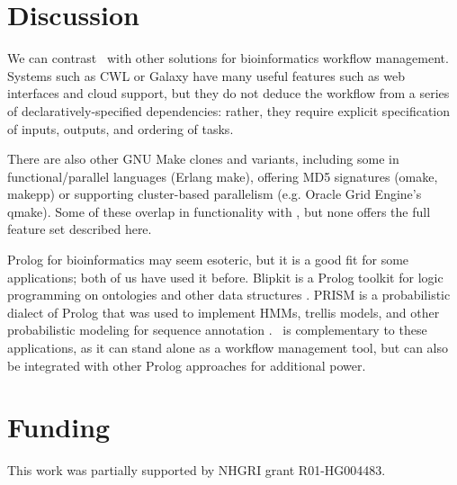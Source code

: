 \section*{Discussion}

We can contrast \biomake\ with other solutions for bioinformatics workflow management.
Systems such as CWL or Galaxy have many useful features such as web interfaces and cloud support,
but they do not deduce the workflow from a series of declaratively-specified dependencies: rather, they require explicit specification of inputs, outputs, and ordering of tasks.

There are also other GNU Make clones and variants, including some in functional/parallel languages (Erlang make),
offering MD5 signatures (omake, makepp)
or supporting cluster-based parallelism (e.g. Oracle Grid Engine's qmake).
Some of these overlap in functionality with \biomake, but none offers the full feature set described here.

Prolog for bioinformatics may seem esoteric, but it is a good fit for some applications; both of us have used it before.
Blipkit is a Prolog toolkit for logic programming on ontologies and other data structures \citep{Blipkit2009}.
PRISM is a probabilistic dialect of Prolog that was used to implement HMMs, trellis models, and other probabilistic modeling for sequence annotation \citep{MorkHolmes2012,HaveMork2014}.
\biomake\ is complementary to these applications, as it can stand alone as a workflow management tool, but can also be integrated with other Prolog approaches for additional power.

%

\section*{Funding}

This work was partially supported by NHGRI grant R01-HG004483.


%
%
%
%
%
%
%
%



